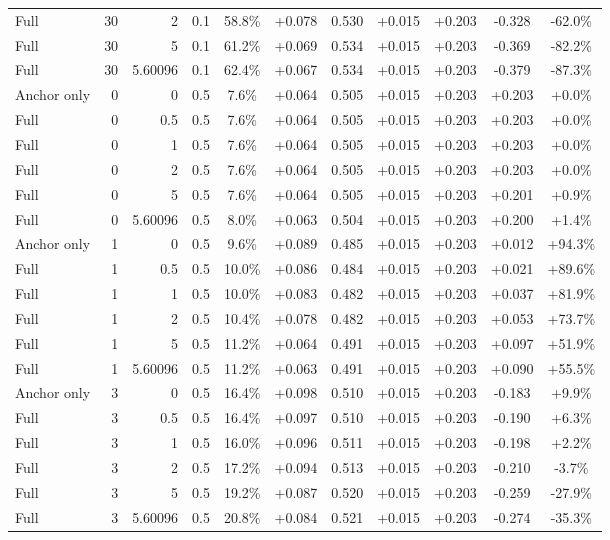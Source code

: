\begin{table}[htbp]
\begin{tabular}{lrrrccccccc}
Full & 30 & 2 & 0.1 & 58.8\% & +0.078 & 0.530 & +0.015 & +0.203 & -0.328 & -62.0\% \\
Full & 30 & 5 & 0.1 & 61.2\% & +0.069 & 0.534 & +0.015 & +0.203 & -0.369 & -82.2\% \\
Full & 30 & 5.60096 & 0.1 & 62.4\% & +0.067 & 0.534 & +0.015 & +0.203 & -0.379 & -87.3\% \\
Anchor only & 0 & 0 & 0.5 & 7.6\% & +0.064 & 0.505 & +0.015 & +0.203 & +0.203 & +0.0\% \\
Full & 0 & 0.5 & 0.5 & 7.6\% & +0.064 & 0.505 & +0.015 & +0.203 & +0.203 & +0.0\% \\
Full & 0 & 1 & 0.5 & 7.6\% & +0.064 & 0.505 & +0.015 & +0.203 & +0.203 & +0.0\% \\
Full & 0 & 2 & 0.5 & 7.6\% & +0.064 & 0.505 & +0.015 & +0.203 & +0.203 & +0.0\% \\
Full & 0 & 5 & 0.5 & 7.6\% & +0.064 & 0.505 & +0.015 & +0.203 & +0.201 & +0.9\% \\
Full & 0 & 5.60096 & 0.5 & 8.0\% & +0.063 & 0.504 & +0.015 & +0.203 & +0.200 & +1.4\% \\
Anchor only & 1 & 0 & 0.5 & 9.6\% & +0.089 & 0.485 & +0.015 & +0.203 & +0.012 & +94.3\% \\
Full & 1 & 0.5 & 0.5 & 10.0\% & +0.086 & 0.484 & +0.015 & +0.203 & +0.021 & +89.6\% \\
Full & 1 & 1 & 0.5 & 10.0\% & +0.083 & 0.482 & +0.015 & +0.203 & +0.037 & +81.9\% \\
Full & 1 & 2 & 0.5 & 10.4\% & +0.078 & 0.482 & +0.015 & +0.203 & +0.053 & +73.7\% \\
Full & 1 & 5 & 0.5 & 11.2\% & +0.064 & 0.491 & +0.015 & +0.203 & +0.097 & +51.9\% \\
Full & 1 & 5.60096 & 0.5 & 11.2\% & +0.063 & 0.491 & +0.015 & +0.203 & +0.090 & +55.5\% \\
Anchor only & 3 & 0 & 0.5 & 16.4\% & +0.098 & 0.510 & +0.015 & +0.203 & -0.183 & +9.9\% \\
Full & 3 & 0.5 & 0.5 & 16.4\% & +0.097 & 0.510 & +0.015 & +0.203 & -0.190 & +6.3\% \\
Full & 3 & 1 & 0.5 & 16.0\% & +0.096 & 0.511 & +0.015 & +0.203 & -0.198 & +2.2\% \\
Full & 3 & 2 & 0.5 & 17.2\% & +0.094 & 0.513 & +0.015 & +0.203 & -0.210 & -3.7\% \\
Full & 3 & 5 & 0.5 & 19.2\% & +0.087 & 0.520 & +0.015 & +0.203 & -0.259 & -27.9\% \\
Full & 3 & 5.60096 & 0.5 & 20.8\% & +0.084 & 0.521 & +0.015 & +0.203 & -0.274 & -35.3\% \\

\end{tabular}
\end{table}
